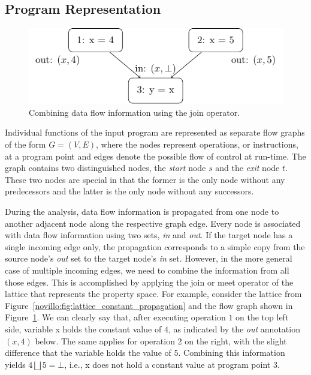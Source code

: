 \subsection{Program Representation}
\label{novillo:sec:program_representation}

\begin{figure}[b]
  \begin{center}
    \includegraphics{contr_flow_graph}
  \end{center}
  \vspace{-1em}
  \caption{Combining data flow information using the join operator.}
  \label{novillo:fig:control_flow_graph}
\end{figure}

Individual functions of the input program are represented as separate flow
graphs of the form $G = (V,E)$, where the nodes represent operations, or
instructions, at a program point and edges denote the possible flow of control
at run-time. The graph contains two distinguished nodes, the \emph{start} node
$s$ and the \emph{exit} node $t$. These two nodes are special in that the former
is the only node without any predecessors and the latter is the only node
without any successors.

During the analysis, data flow information is propagated from one node to
another adjacent node along the respective graph edge. Every node is associated
with data flow information using two sets, \emph{in} and \emph{out}. If the
target node has a single incoming edge only, the propagation corresponds to a
simple copy from the source node's \emph{out} set to the target node's \emph{in}
set. However, in the more general case of multiple incoming edges, we need to
combine the information from all those edges. This is accomplished by applying
the join or meet operator of the lattice that represents the property space. For
example, consider the lattice from
Figure~\ref{novillo:fig:lattice_constant_propagation} and the flow graph shown
in Figure~\ref{novillo:fig:control_flow_graph}. We can clearly say that, after
executing operation $1$ on the top left side, variable x holds the
constant value of $4$, as indicated by the \emph{out} annotation $(x, 4)$ below.
The same applies for operation $2$ on the right, with the slight difference that
the variable holds the value of $5$. Combining this information yields $4
\bigsqcup 5 = \bot$, i.e., x does not hold a constant value at program point 3.

